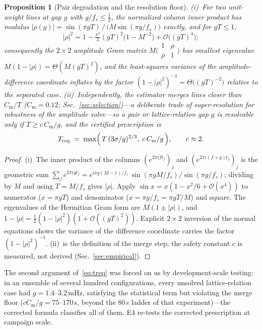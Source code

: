 \documentclass[twocolumn,preprintnumbers,amsmath,amssymb,pra,floatfix]{revtex4-2}
\newcommand{\bigO}{\mathcal{O}}
\newtheorem{proposition}{Proposition}
\begin{document}
\begin{proposition}[Pair degradation and the resolution floor]
\label{prop:pair}
(i)~For two unit-weight lines at gap $g$ with $g/f_s\le\tfrac12$, the
normalized column inner product has modulus
$|\rho(g)|=\sin(\pi gT)\,/\,\bigl(M\sin(\pi g/f_s)\bigr)$ exactly,
and for $gT\le1$,
\begin{equation*}
  |\rho|^{2}=1-\tfrac{\pi^{2}}{3}(gT)^{2}\bigl(1-M^{-2}\bigr)
  +\bigO\!\bigl((gT)^{4}\bigr);
\end{equation*}
consequently the $2\times2$ amplitude Gram matrix
$M\bigl(\begin{smallmatrix}1&\rho\\\bar\rho&1\end{smallmatrix}\bigr)$
has smallest eigenvalue $M(1-|\rho|)=\Theta(M(gT)^{2})$, and the
least-squares variance of the amplitude-difference coordinate
inflates by the factor
$(1-|\rho|^{2})^{-1}=\Theta\bigl((gT)^{-2}\bigr)$ relative to the
separated case.
(ii)~Independently, the estimator merges lines closer than
$C_{\mathrm{m}}/T$ ($C_{\mathrm{m}}=0.12$;
Sec.~\ref{sec:selection})---a deliberate trade of super-resolution
for robustness of the amplitude solve---so a pair or lattice-relation
gap $g$ is resolvable only if $T\ge c\,C_{\mathrm{m}}/g$, and the
certified prescription is
\begin{equation}
  T_{\mathrm{req}}
  \;=\;\max\Bigl(\,T\,(3\sigma/g)^{2/3},\;
  c\,C_{\mathrm{m}}/g\,\Bigr),\qquad c\approx2.
  \label{eq:treq}
\end{equation}
\end{proposition}
\begin{proof}
(i)~The inner product of the columns $(e^{2\pi ift_j})_j$ and
$(e^{2\pi i(f+g)t_j})_j$ is the geometric sum
$\sum_je^{2\pi igt_j}
=e^{i\pi g(M-1)/f_s}\,\sin(\pi gM/f_s)/\sin(\pi g/f_s)$; dividing by
$M$ and using $T=M/f_s$ gives $|\rho|$.  Apply
$\sin x=x(1-x^{2}/6+\bigO(x^{4}))$ to numerator
($x=\pi gT$) and denominator ($x=\pi g/f_s=\pi gT/M$) and square.
The eigenvalues of the Hermitian Gram form are $M(1\pm|\rho|)$, and
$1-|\rho|=\tfrac12(1-|\rho|^{2})(1+\bigO((gT)^{2}))$.  Explicit
$2\times2$ inversion of the normal equations shows the variance of
the difference coordinate carries the factor $(1-|\rho|^{2})^{-1}$.
(ii)~is the definition of the merge step; the safety constant $c$ is
measured, not derived (Sec.~\ref{sec:empirical}).
\end{proof}

The second argument of~\eqref{eq:treq} was forced on us by
development-scale testing: in an ensemble of several hundred
configurations, every unsolved
lattice-relation case had $g=1.4$--$3.2$\,mHz, satisfying the
statistical term but violating the merge floor
($cC_{\mathrm{m}}/g=75$--$170$\,s, beyond the $80$\,s ladder of that
experiment)---the corrected formula classifies all of them.  E4
re-tests the corrected prescription at campaign scale.
\end{document}
